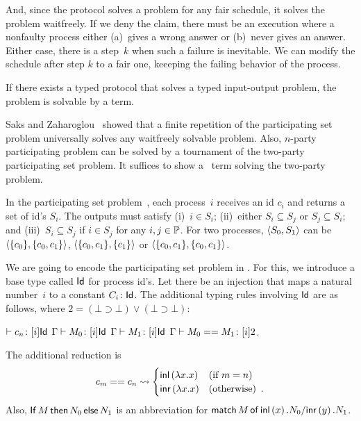{And, since the protocol solves a problem for any fair schedule, it
solves the problem waitfreely.
If we deny the claim, there must be an execution where a nonfaulty
process
either (a)~gives a
wrong answer or
 (b)~never gives an answer.
 Either case, there is a step~$k$ when
 such a failure is inevitable.
We can modify the schedule after step $k$ to a fair one,
keeeping the failing behavior of
the process.


\begin{theorem}[Completeness]
If there exists a typed protocol that solves a typed input-output
 problem,
the problem is solvable by a term.
\end{theorem}

Saks and Zaharoglou~\cite{Saks:1993vq} showed that a finite repetition of the participating set
problem universally solves any waitfreely solvable problem.
Also, $n$-party participating problem can be solved by a tournament of
the two-party participating set problem.
It suffices to show a \lgd\, term solving the two-party problem.


In the participating set problem~\cite{borowsky},
each process~$i$ receives an id $c_i$ and
returns a set of id's $S_i$.
The outputs must satisfy (i)~$i\in S_i$; (ii)~either $S_i\subseteq S_j$
or $S_j\subseteq S_i$; and (iii)~$S_i\subseteq S_j$  if $i\in S_j$ for any
$i,j\in\mathbb{P}$.
For two processes,
$\langle{S_0, S_1}\rangle$ can be $\langle{\{c_0\}, \{c_0, c_1\}}\rangle$, $\langle{\{c_0, c_1\}, \{c_1\}}\rangle$
or
$\langle{\{c_0, c_1\}, \{c_0, c_1\}}\rangle$.

We are going to encode the participating set problem in \lgd.
For this, we introduce a base type called $\mathsf{Id}$ for process id's.
Let there be an injection that maps a natural number~$i$ to a constant
$C_i\colon\mathsf{Id}$.
The additional typing rules involving $\mathsf{Id}$ are as follows, where $2 = (\bot\supset\bot)\vee(\bot\supset\bot)$:
\begin{center}
 \UnaryRule{}{}
 {$\vdash {c_n} \colon{[i]\mathsf{Id}}$}
 \hfill
 \BinaryRule
 {$\Gamma\vdash {M_0} \colon{[}i]\mathsf{Id}$}
 {$\Gamma\vdash {M_1} \colon{[}i]\mathsf{Id}$}
 {}
 {$\Gamma \vdash {{M_0} == {M_1}} \colon{[i]2}$}\enspace.
\end{center}
The additional reduction is
\[
 c_m == c_n \rightsquigarrow
\begin{cases}
 \mathsf{inl}\left({\lambda x.x}\right)& (\text{if } m = n)\\
 \mathsf{inr}\left({\lambda x.x}\right)& (\text{otherwise})\enspace.
\end{cases}
\]
Also,
${\mathsf{If}\, {M}\, \mathsf{then}\, {N_0}\, \mathsf{else}\, {N_1}}$
is an abbreviation for
${\mathsf{match}\,{M}\,\mathsf{of}\, \mathsf{inl}\left({x}\right). {N_0}/ \mathsf{inr}\left({y}\right). {N_1}}$.

}

